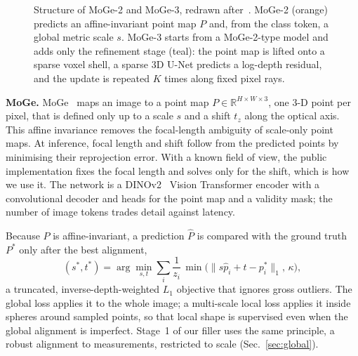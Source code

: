 \documentclass[conference]{IEEEtran}
\newcommand{\R}{\mathbb{R}}
\begin{document}
\begin{figure}[t]
{}
\caption{Structure of MoGe-2 and MoGe-3, redrawn after~\cite{wang2025moge2,kong2026moge3}.
MoGe-2 (orange) predicts an affine-invariant point map \(P\) and, from the class
token, a global metric scale \(s\). MoGe-3 starts from a MoGe-2-type model and
adds only the refinement stage (teal): the point map is lifted onto a sparse
voxel shell, a sparse 3D U-Net predicts a log-depth residual, and the update is
repeated \(K\) times along fixed pixel rays.}
\label{fig:moge}
\end{figure}

\textbf{MoGe.} MoGe~\cite{wang2025moge} maps an image to a point map
\(P\in\R^{H\times W\times3}\), one 3-D point per pixel, that is defined only up to
a scale \(s\) and a shift \(t_z\) along the optical axis. This affine invariance
removes the focal-length ambiguity of scale-only point maps. At inference, focal
length and shift follow from the predicted points by minimising their
reprojection error. With a known field of view, the public implementation fixes
the focal length and solves only for the shift, which is how we use it. The
network is a DINOv2~\cite{oquab2024dinov2} Vision Transformer encoder with a
convolutional decoder and heads for the point map and a validity mask; the
number of image tokens trades detail against latency.

Because \(P\) is affine-invariant, a prediction \(\hat P\) is compared with the
ground truth \(P^\ast\) only after the best alignment,
\begin{equation}
  (s^\ast,t^\ast)=\arg\min_{s,t}\sum_i \frac{1}{z_i}\,
  \min\!\big(\|s\hat p_i+t-p^\ast_i\|_1,\,\kappa\big),
  \label{eq:roe}
\end{equation}
a truncated, inverse-depth-weighted \(L_1\) objective that ignores gross
outliers. The global loss applies it to the whole image; a multi-scale local
loss applies it inside spheres around sampled points, so that local shape is
supervised even when the global alignment is imperfect. Stage~1 of our filler
uses the same principle, a robust alignment to measurements, restricted to
scale (Sec.~\ref{sec:global}).
\end{document}
